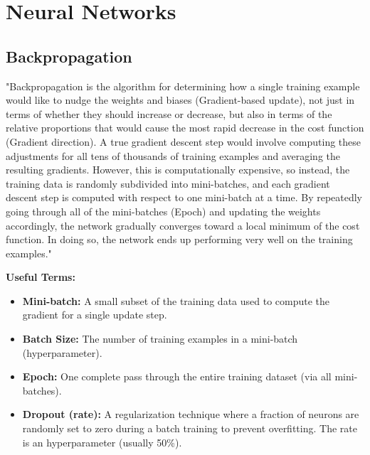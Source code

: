 \section{Neural Networks}

\subsection{Backpropagation}
"Backpropagation is the algorithm for determining how a single training example would like to nudge the weights and biases (Gradient-based update), not just in terms of whether they should increase or decrease, but also in terms of the relative proportions that would cause the most rapid decrease in the cost function (Gradient direction). A true gradient descent step would involve computing these adjustments for all tens of thousands of training examples and averaging the resulting gradients. However, this is computationally expensive, so instead, the training data is randomly subdivided into mini-batches, and each gradient descent step is computed with respect to one mini-batch at a time. By repeatedly going through all of the mini-batches (Epoch) and updating the weights accordingly, the network gradually converges toward a local minimum of the cost function. In doing so, the network ends up performing very well on the training examples."


\textbf{Useful Terms:}
\begin{itemize}
    \item \textbf{Mini-batch:} A small subset of the training data used to compute the gradient for a single update step.
    \item \textbf{Batch Size:} The number of training examples in a mini-batch (hyperparameter).
    \item \textbf{Epoch:} One complete pass through the entire training dataset (via all mini-batches).
    \item \textbf{Dropout (rate):} A regularization technique where a fraction of neurons are randomly set to zero during a batch training to prevent overfitting. The rate is an hyperparameter (usually 50\%).
\end{itemize}

